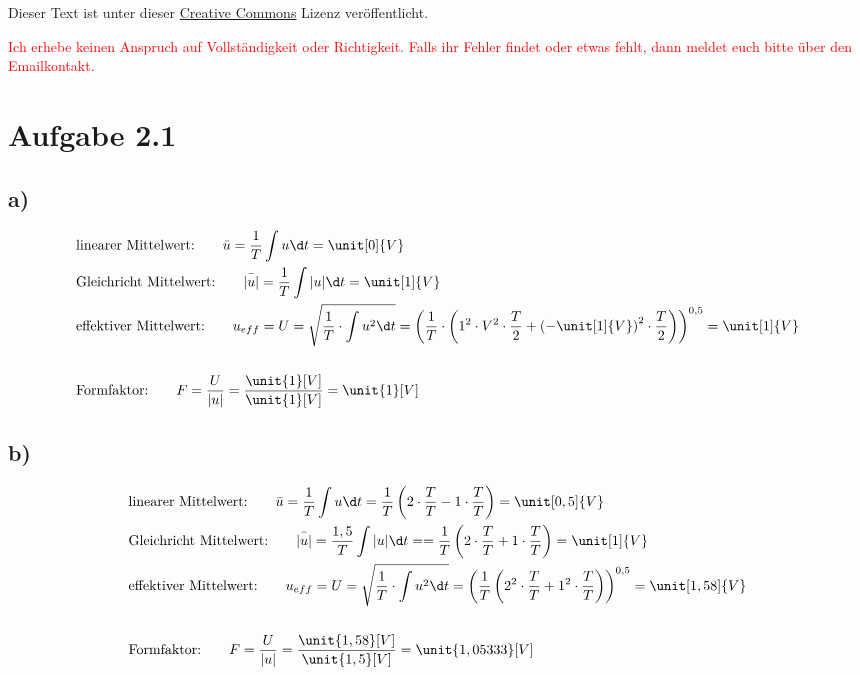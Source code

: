 




\maketitle

Dieser Text ist unter dieser \href{http://creativecommons.org/licenses/by-nc-sa/4.0/}{Creative Commons} Lizenz veröffentlicht.

\textcolor{red}{Ich erhebe keinen Anspruch auf Vollständigkeit oder Richtigkeit. Falls ihr Fehler findet oder etwas fehlt, dann meldet euch bitte über den Emailkontakt.}

\tableofcontents


\newpage

\section{Aufgabe 2.1}

\subsection*{a)}

\begin{align*}
	&\text{linearer Mittelwert:} \qquad \bar{u} = \frac{1}{T} \int u \d t = \unit[0]{V} \\
	&\text{Gleichricht Mittelwert:} \qquad \bar{|u|} = \frac{1}{T} \int |u| \d t = \unit[1]{V} \\
	&\text{effektiver Mittelwert:} \qquad u_{eff} = U = \sqrt{\frac{1}{T} \cdot \int u^2 \d t} = \left(\frac{1}{T} \cdot \left( 1^2 \cdot V^2 \cdot \frac{T}{2} + \left(- \unit[1]{V} \right)^2 \cdot \frac{T}{2} \right) \right)^{0,5} = \unit[1]{V} \\
	\hfill \\
	&\text{Formfaktor:} \qquad F = \frac{U}{|u|} = \frac{\unit{1}[V]}{\unit{1}[V]} = \unit{1}[V]
\end{align*}

\subsection*{b)}

\begin{align*}
	&\text{linearer Mittelwert:} \qquad \bar{u} = \frac{1}{T} \int u \d t = \frac{1}{T} \left(2 \cdot \frac{T}{T} - 1 \cdot \frac{T}{T} \right) = \unit[0,5]{V} \\
	&\text{Gleichricht Mittelwert:} \qquad \bar{|u|} = \frac{1,5}{T} \int |u| \d t = = \frac{1}{T} \left(2 \cdot \frac{T}{T} + 1 \cdot \frac{T}{T} \right) = \unit[1]{V} \\
	&\text{effektiver Mittelwert:} \qquad u_{eff} = U = \sqrt{\frac{1}{T} \cdot \int u^2 \d t} = \left(\frac{1}{T} \left(2^2 \cdot \frac{T}{T} + 1^2 \cdot \frac{T}{T} \right) \right)^{0,5} = \unit[1,58]{V} \\
	\hfill \\
	&\text{Formfaktor:} \qquad F = \frac{U}{|u|} = \frac{\unit{1,58}[V]}{\unit{1,5}[V]} = \unit{1,05333}[V]
\end{align*}


